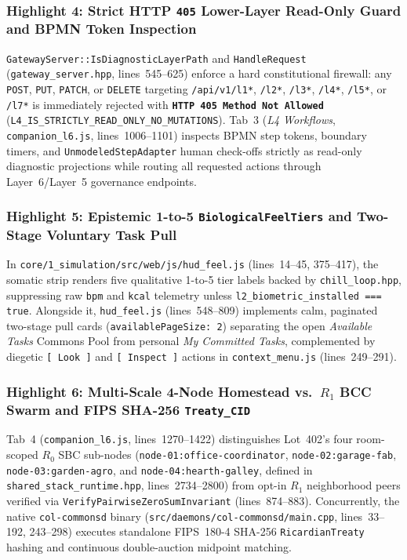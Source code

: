 \subsubsection{Highlight 4: Strict HTTP \texttt{405} Lower-Layer Read-Only Guard and BPMN Token Inspection}
\texttt{GatewayServer::IsDiagnosticLayerPath} and \texttt{HandleRequest} (\texttt{gateway\_server.hpp}, lines~545--625) enforce a hard constitutional firewall: any \texttt{POST}, \texttt{PUT}, \texttt{PATCH}, or \texttt{DELETE} targeting \texttt{/api/v1/l1*}, \texttt{/l2*}, \texttt{/l3*}, \texttt{/l4*}, \texttt{/l5*}, or \texttt{/l7*} is immediately rejected with \textbf{\texttt{HTTP 405 Method Not Allowed}} (\texttt{L4\_IS\_STRICTLY\_READ\_ONLY\_NO\_MUTATIONS}). Tab~3 (\textit{L4 Workflows}, \texttt{companion\_l6.js}, lines~1006--1101) inspects BPMN step tokens, boundary timers, and \texttt{UnmodeledStepAdapter} human check-offs strictly as read-only diagnostic projections while routing all requested actions through Layer~6/Layer~5 governance endpoints.

\subsubsection{Highlight 5: Epistemic 1-to-5 \texttt{BiologicalFeelTiers} and Two-Stage Voluntary Task Pull}
In \texttt{core/1\_simulation/src/web/js/hud\_feel.js} (lines~14--45, 375--417), the somatic strip renders five qualitative 1-to-5 tier labels backed by \texttt{chill\_loop.hpp}, suppressing raw \texttt{bpm} and \texttt{kcal} telemetry unless \texttt{l2\_biometric\_installed === true}. Alongside it, \texttt{hud\_feel.js} (lines~548--809) implements calm, paginated two-stage pull cards (\texttt{availablePageSize: 2}) separating the open \textit{Available Tasks} Commons Pool from personal \textit{My Committed Tasks}, complemented by diegetic \texttt{[ Look ]} and \texttt{[ Inspect ]} actions in \texttt{context\_menu.js} (lines~249--291).

\subsubsection{Highlight 6: Multi-Scale 4-Node Homestead vs.\ $R_1$ BCC Swarm and FIPS SHA-256 \texttt{Treaty\_CID}}
Tab~4 (\texttt{companion\_l6.js}, lines~1270--1422) distinguishes Lot~402's four room-scoped $R_0$ SBC sub-nodes (\texttt{node-01:office-coordinator}, \texttt{node-02:garage-fab}, \texttt{node-03:garden-agro}, and \texttt{node-04:hearth-galley}, defined in \texttt{shared\_stack\_runtime.hpp}, lines~2734--2800) from opt-in $R_1$ neighborhood peers verified via \texttt{VerifyPairwiseZeroSumInvariant} (lines~874--883). Concurrently, the native \texttt{col-commonsd} binary (\texttt{src/daemons/col-commonsd/main.cpp}, lines~33--192, 243--298) executes standalone FIPS~180-4 SHA-256 \texttt{RicardianTreaty} hashing and continuous double-auction midpoint matching.

